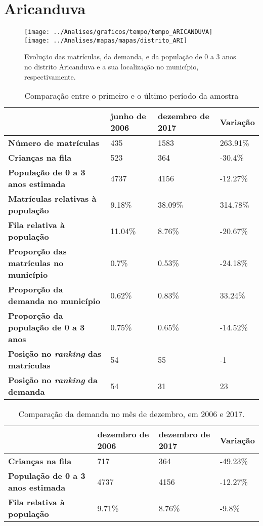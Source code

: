 \section{Aricanduva}
\begin{figure}[H]
\centering
\texttt{[image: ../Analises/graficos/tempo/tempo\_ARICANDUVA]}
\texttt{[image: ../Analises/mapas/mapas/distrito\_ARI]}
\caption{Evolução das matrículas, da demanda, e da população de 0 a 3 anos no distrito Aricanduva e a sua localização no município, respectivamente.}
\end{figure}
\begin{table}[H]
\begin{tabular}{l|l|l|l}
\textbf{}                                      & \textbf{junho de 2006}       & \textbf{dezembro de 2017}    & \textbf{Variação} \\ \hline
\textbf{Número de matrículas}                  & 435 & 1583 & 263.91\% \\ \hline
\textbf{Crianças na fila}                      & 523 & 364 & -30.4\% \\ \hline
\textbf{População de 0 a 3 anos estimada}      & 4737 & 4156 & -12.27\% \\ \hline
\textbf{Matrículas relativas à população}      & 9.18\% & 38.09\% & 314.78\% \\ \hline
\textbf{Fila relativa à população}             & 11.04\% & 8.76\% & -20.67\% \\ \hline
\textbf{Proporção das matrículas no município} & 0.7\% & 0.53\% & -24.18\% \\ \hline
\textbf{Proporção da demanda no município}     & 0.62\% & 0.83\% & 33.24\% \\ \hline
\textbf{Proporção da população de 0 a 3 anos}  & 0.75\% & 0.65\% & -14.52\% \\ \hline
\textbf{Posição no \textit{ranking} das matrículas}     & 54 & 55 & -1 \\ \hline
\textbf{Posição no \textit{ranking} da demanda}         & 54 & 31 & 23 \\ 
\end{tabular}
\caption{Comparação entre o primeiro e o último período da amostra}
\end{table}
\begin{table}[H]
\begin{tabular}{l|l|l|l}
\textbf{}                                 & \textbf{dezembro de 2006} & \textbf{dezembro de 2017} & \textbf{Variação} \\ \hline
\textbf{Crianças na fila}                      & 717 & 364 & -49.23\% \\ \hline
\textbf{População de 0 a 3 anos estimada}      & 4737 & 4156 & -12.27\% \\ \hline
\textbf{Fila relativa à população}             & 9.71\% & 8.76\% & -9.8\% \\
\end{tabular}
\caption{Comparação da demanda no mês de dezembro, em 2006 e 2017.}
\end{table}
